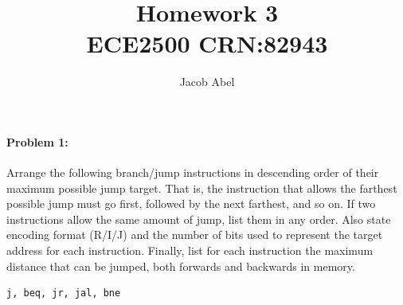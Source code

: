 \documentclass[12pt,letterpaper,titlepage]{article}
\author{Jacob Abel}
\title{	Homework 3
	\\\large ECE2500 CRN:82943
}
\begin{document}
\maketitle
\begin{raggedright}

\paragraph{Problem 1: }
Arrange the following branch/jump instructions in descending order of their maximum possible jump target. That is, the instruction that allows the farthest possible jump must go first, followed by the next farthest, and so on. If two instructions allow the same amount of jump, list them in any order. Also state encoding format (R/I/J) and the number of bits used to represent the target address for each instruction. Finally, list for each instruction the maximum distance that can be jumped, both forwards and backwards in memory.

\begin{lstlisting}
j, beq, jr, jal, bne
\end{lstlisting}


\end{raggedright}
\end{document}
